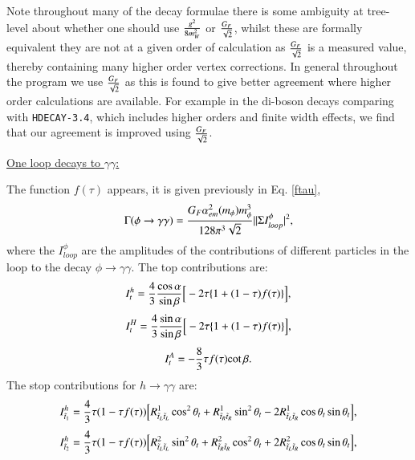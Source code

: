 \documentclass[final,3p,times]{elsarticle}
\begin{document}
Note throughout many of the decay formulae there is some ambiguity at tree-level about whether one should use $g^2 \over 8 m_W^2$ or $G_{F} \over \sqrt{2}$, whilst these are formally equivalent they are not at a given order of calculation as $G_{F} \over \sqrt{2}$ is a measured value, thereby containing many higher order vertex corrections. In general throughout the program we use $G_{F} \over \sqrt{2}$ as this is found to give better agreement where higher order calculations are available. For example in the di-boson decays comparing with {\tt HDECAY-3.4}, which includes higher orders and finite width effects, we find that our agreement is improved using $G_{F} \over \sqrt{2}$.

\underline{One loop decays to $\gamma \gamma$:}

The function $f(\tau)$ appears, it is given previously in Eq. \eqref{ftau},
\begin{equation} \label{phigamgam}
\Gamma (\phi \rightarrow \gamma \gamma) = {G_{F} \alpha_{em}^2 (m_{\phi}) m_{\phi}^3 \over 128 \pi^3 \sqrt{2}}||\Sigma I_{loop}^{\phi}|^2,
\end{equation}
where the $I_{loop}^{\phi}$ are the amplitudes of the contributions of different particles in the loop to the decay $ \phi \rightarrow \gamma \gamma$.
The top contributions are:
\begin{equation}
I_{t}^{h} = {4 \over 3} {\cos \alpha \over \sin \beta} \Big[-2\tau \{1+(1-\tau)f(\tau)\}\Big],
\end{equation}
\begin{equation}
I_{t}^{H} = {4 \over 3} {\sin \alpha \over \sin \beta} \Big[-2\tau \{1+(1-\tau)f(\tau)\}\Big],
\end{equation}
\begin{equation}
I_{t}^{A} = -{8 \over 3}  \tau f(\tau){\cot \beta}.
\end{equation}
The stop contributions for $h \rightarrow \gamma \gamma$ are:
\begin{equation}
I_{\tilde{t}_1}^h = {4 \over 3} \tau (1- \tau f(\tau))\Big[R_{\tilde{t}_L \tilde{t}_L}^1 \cos^2 \theta_t + R_{\tilde{t}_R \tilde{t}_R}^1 \sin^2 \theta_t - 2R_{\tilde{t}_L \tilde{t}_R}^1 \cos\theta_t \sin\theta_t\Big],
\end{equation}
\begin{equation}
I_{\tilde{t}_2}^h = {4 \over 3} \tau (1- \tau f(\tau))\Big[R_{\tilde{t}_L \tilde{t}_L}^2 \sin^2 \theta_t + R_{\tilde{t}_R \tilde{t}_R}^2 \cos^2 \theta_t + 2R_{\tilde{t}_L \tilde{t}_R}^2 \cos\theta_t \sin\theta_t\Big],
\end{equation}
\end{document}
